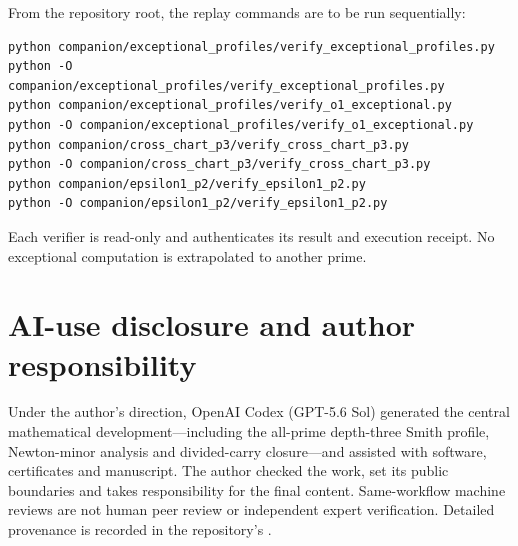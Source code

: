 \documentclass[12pt,a4paper]{article}
\theoremstyle{definition}
\begin{document}
From the repository root, the replay commands are to be run sequentially:
\begin{verbatim}
python companion/exceptional_profiles/verify_exceptional_profiles.py
python -O companion/exceptional_profiles/verify_exceptional_profiles.py
python companion/exceptional_profiles/verify_o1_exceptional.py
python -O companion/exceptional_profiles/verify_o1_exceptional.py
python companion/cross_chart_p3/verify_cross_chart_p3.py
python -O companion/cross_chart_p3/verify_cross_chart_p3.py
python companion/epsilon1_p2/verify_epsilon1_p2.py
python -O companion/epsilon1_p2/verify_epsilon1_p2.py
\end{verbatim}
Each verifier is read-only and authenticates its result and execution
receipt.  No exceptional computation is extrapolated to another prime.

\section*{AI-use disclosure and author responsibility}

Under the author's direction, OpenAI Codex (GPT-5.6 Sol) generated the central
mathematical development---including the all-prime depth-three Smith profile,
Newton-minor analysis and divided-carry closure---and assisted with software,
certificates and manuscript.  The author checked the work, set its public
boundaries and takes responsibility for the final content.  Same-workflow
machine reviews are not human peer review or independent expert verification.
Detailed provenance is recorded in the repository's .

\printbibliography
\end{document}
